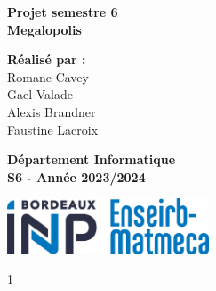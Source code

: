 \documentclass[12pt, a4paper]{article}
\begin{document}
\begin{titlepage}
	\begin{center}
		
		\vspace*{4cm}
		{ \Huge \bfseries Projet semestre 6} \\
		\vspace*{0.5cm}
		{ \Huge \bfseries Megalopolis}

		\vspace*{1cm}
		\textbf{Réalisé par :}\\
		\Large Romane Cavey\\
            \Large Gael Valade\\
            \Large Alexis Brandner\\
            \Large Faustine Lacroix\\
		
		\vspace*{3cm}

		\Large \textbf{Département Informatique}\\
		\Large \textbf{S6 - Année 2023/2024}\\
		
        \vspace{5cm}
		
		\begin{flushright}
		    \includegraphics[width=6cm]{images/Enseirb.png}
        \end{flushright}1
		
	\end{center}
	\restoregeometry
\end{titlepage}

\newpage
\tableofcontents
\newpage
























\end{document}
